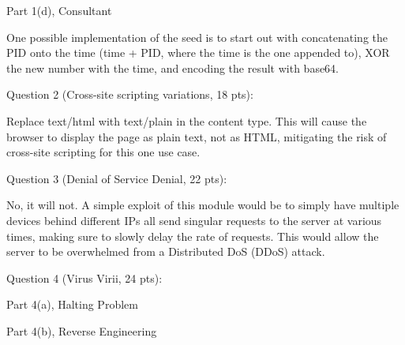 \documentclass[11pt]{article}
\begin{document}
Part 1(d), Consultant

\vspace{1.5in}

One possible implementation of the seed is to start out with concatenating the PID onto the time (time + PID, where the time is the one appended to), XOR the new number with the time, and encoding the result with base64.

Question 2 (Cross-site scripting variations, 18 pts):

Replace text/html with text/plain in the content type. This will cause the browser to display the page as plain text, not as HTML, mitigating the risk of cross-site scripting for this one use case.

\newpage

Question 3 (Denial of Service Denial, 22 pts):

No, it will not. A simple exploit of this module would be to simply have multiple devices behind different IPs all send singular requests to the server at various times, making sure to slowly delay the rate of requests. This would allow the server to be overwhelmed from a Distributed DoS (DDoS) attack.

\newpage

Question 4 (Virus Virii, 24 pts):

\vspace{1.5in}

Part 4(a), Halting Problem



\vspace{1.5in}

Part 4(b), Reverse Engineering
\end{document}
